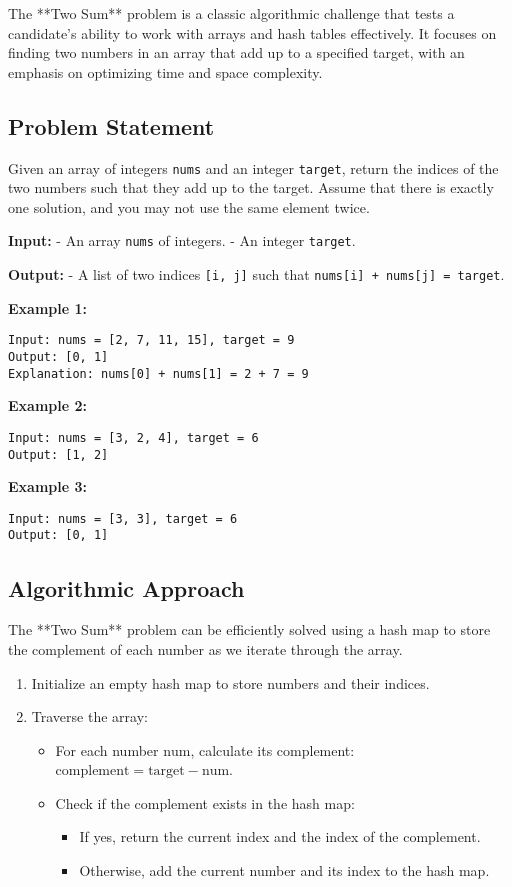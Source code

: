 \label{problem:TwoSum}

The **Two Sum** problem is a classic algorithmic challenge that tests a candidate's ability to work with arrays and hash tables effectively. It focuses on finding two numbers in an array that add up to a specified target, with an emphasis on optimizing time and space complexity.

\subsection*{Problem Statement}
Given an array of integers \texttt{nums} and an integer \texttt{target}, return the indices of the two numbers such that they add up to the target. Assume that there is exactly one solution, and you may not use the same element twice.

\textbf{Input:} 
- An array \texttt{nums} of integers.
- An integer \texttt{target}.

\textbf{Output:} 
- A list of two indices \texttt{[i, j]} such that \texttt{nums[i] + nums[j] = target}.

\textbf{Example 1:}
\begin{verbatim}
Input: nums = [2, 7, 11, 15], target = 9
Output: [0, 1]
Explanation: nums[0] + nums[1] = 2 + 7 = 9
\end{verbatim}

\textbf{Example 2:}
\begin{verbatim}
Input: nums = [3, 2, 4], target = 6
Output: [1, 2]
\end{verbatim}

\textbf{Example 3:}
\begin{verbatim}
Input: nums = [3, 3], target = 6
Output: [0, 1]
\end{verbatim}

\subsection*{Algorithmic Approach}
The **Two Sum** problem can be efficiently solved using a hash map to store the complement of each number as we iterate through the array.

\begin{enumerate}
    \item Initialize an empty hash map to store numbers and their indices.
    \item Traverse the array:
    \begin{itemize}
        \item For each number \( \text{num} \), calculate its complement: \( \text{complement} = \text{target} - \text{num} \).
        \item Check if the complement exists in the hash map:
        \begin{itemize}
            \item If yes, return the current index and the index of the complement.
            \item Otherwise, add the current number and its index to the hash map.
        \end{itemize}
    \end{itemize}
\end{enumerate}


